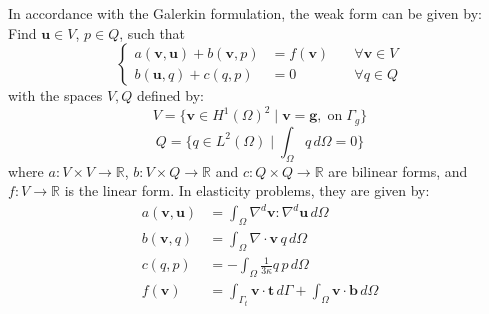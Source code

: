 In accordance with the Galerkin formulation, the weak form can be given by:
Find $\boldsymbol{u} \in V$, $p \in Q$, such that
\begin{equation}\label{weak_form}
\left\{
\begin{aligned}
a(\boldsymbol{v}, \boldsymbol{u}) + b(\boldsymbol{v}, p) &= f(\boldsymbol{v}) \quad &\forall \boldsymbol{v} \in V \\
b(\boldsymbol{u}, q) + c(q, p) &= 0 \quad &\forall q \in Q
\end{aligned}
\right.
\end{equation}
with the spaces $V, Q$ defined by:
\begin{equation}\label{mix_formulation}
V = \{\boldsymbol{v} \in H^1(\Omega)^2 \mid \boldsymbol{v} = \boldsymbol{g}, \; \textrm{on} \; \Gamma_g\}
\end{equation}
\begin{equation}
Q = \{q \in L^2(\Omega) \mid \int_{\Omega} q \, d\Omega = 0\}
\end{equation}
where $a: V \times V \rightarrow \mathbb{R}$, $b: V \times Q \rightarrow \mathbb{R}$ and $c: Q \times Q \rightarrow \mathbb{R}$ are bilinear forms, and $f: V \rightarrow \mathbb{R}$ is the linear form. In elasticity problems, they are given by:
\begin{align}
a(\boldsymbol{v}, \boldsymbol{u}) &= \int_\Omega \nabla^d \boldsymbol{v} : \nabla^d \boldsymbol{u} \, d\Omega \\
b(\boldsymbol{v}, q) &= \int_\Omega \nabla \cdot \boldsymbol{v} \, q \, d\Omega \\
\label{form_c}
c(q, p) &= -\int_\Omega \frac{1}{3\kappa} q \, p \, d\Omega \\
f(\boldsymbol{v}) &= \int_{\Gamma_t} \boldsymbol{v} \cdot \boldsymbol{t} \, d\Gamma + \int_{\Omega} \boldsymbol{v} \cdot \boldsymbol{b} \, d\Omega
\end{align}

